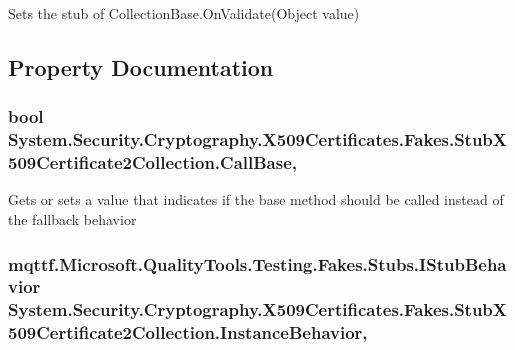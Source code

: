 Sets the stub of Collection\-Base.\-On\-Validate(\-Object value)



\subsection{Property Documentation}
\hypertarget{class_system_1_1_security_1_1_cryptography_1_1_x509_certificates_1_1_fakes_1_1_stub_x509_certificate2_collection_a594284e1a92cb30adba39edc451be699}{
\subsubsection[{Call\-Base}]{\setlength{\rightskip}{0pt plus 5cm}bool System.\-Security.\-Cryptography.\-X509\-Certificates.\-Fakes.\-Stub\-X509\-Certificate2\-Collection.\-Call\-Base\hspace{0.3cm}{\ttfamily [get]}, {\ttfamily [set]}}}\label{class_system_1_1_security_1_1_cryptography_1_1_x509_certificates_1_1_fakes_1_1_stub_x509_certificate2_collection_a594284e1a92cb30adba39edc451be699}


Gets or sets a value that indicates if the base method should be called instead of the fallback behavior

\hypertarget{class_system_1_1_security_1_1_cryptography_1_1_x509_certificates_1_1_fakes_1_1_stub_x509_certificate2_collection_af9fc8c554397ab62fa9246ea78c1a439}{
\subsubsection[{Instance\-Behavior}]{\setlength{\rightskip}{0pt plus 5cm}mqttf.\-Microsoft.\-Quality\-Tools.\-Testing.\-Fakes.\-Stubs.\-I\-Stub\-Behavior System.\-Security.\-Cryptography.\-X509\-Certificates.\-Fakes.\-Stub\-X509\-Certificate2\-Collection.\-Instance\-Behavior\hspace{0.3cm}{\ttfamily [get]}, {\ttfamily [set]}}}\label{class_system_1_1_security_1_1_cryptography_1_1_x509_certificates_1_1_fakes_1_1_stub_x509_certificate2_collection_af9fc8c554397ab62fa9246ea78c1a439}


